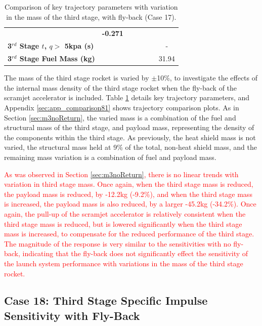 \begin{table}[ht]
\begin{tabular}{l c c c c c c}
		& \textbf{-0.271}
		\\
		\textbf{3$^{rd}$ Stage $t$, $q >$ 5kpa (s)}
		& \thirdqOverFivemThreeNinety
		& \thirdqOverFivemThreeNinetyFive
		& \thirdqOverFivemThreeStandard
		& \thirdqOverFivemThreeOneHundredFive
		& \thirdqOverFivemThreeOneHundredTen
		& -
		\\
		\textbf{3$^{rd}$ Stage Fuel Mass (kg)}
		& \thirdmFuelmThreeNinety
		& \thirdmFuelmThreeNinetyFive
		& \thirdmFuelmThreeStandard
		& \thirdmFuelmThreeOneHundredFive
		& \thirdmFuelmThreeOneHundredTen
		&31.94
		\\
		\hline 
	\end{tabular} 
	\caption{Comparison of key trajectory parameters with variation in the mass of the third stage, with fly-back (Case 17).}
	\label{tab:comparison81}
\end{table}

The mass of the third stage rocket is varied by $\pm$10\%, to investigate the effects of the internal mass density of the third stage rocket when the fly-back of the scramjet accelerator is included. Table \ref{tab:comparison81} details key trajectory parameters, and Appendix \ref{sec:app_comparison81} shows trajectory comparison plots. As in Section \ref{sec:m3noReturn}, the varied mass is a combination of the fuel and structural mass of the third stage, and payload mass, representing the density of the components within the third stage. As previously, the heat shield mass is not varied, the structural mass held at 9\% of the total, non-heat shield mass, and the remaining mass variation is a combination of fuel and payload mass.

\textcolor{red}{
As was observed in Section \ref{sec:m3noReturn}, there is no linear trends with variation in third stage mass. Once again, when the third stage mass is reduced, the payload mass is reduced, by -12.2kg (-9.2\%), and when the third stage mass is increased, the payload mass is also reduced, by a larger -45.2kg (-34.2\%). Once again, the pull-up of the scramjet accelerator is relatively consistent when the third stage mass is reduced, but is lowered significantly when the third stage mass is increased, to compensate for the reduced performance of the third stage. The magnitude of the response is very similar to the sensitivities with no fly-back, indicating that the fly-back does not significantly effect the sensitivity of the launch system performance with variations in the mass of the third stage rocket. 
}


\subsection{Case 18: Third Stage Specific Impulse Sensitivity with Fly-Back}


